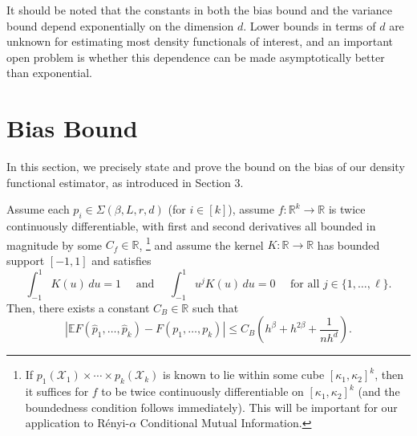 \documentclass{article} %
\newcommand{\R}{\mathbb{R}}                         %
\newcommand{\X}{\mathcal{X}}                        %
\newcommand{\E}{\mathbb{E}}                         %
\begin{document}
It should be noted that the constants in both the bias bound and the variance
bound depend exponentially on the dimension $d$. Lower bounds in terms of $d$
are unknown for estimating most density functionals of interest, and an
important open problem is whether this dependence can be made asymptotically
better than exponential.

\section{Bias Bound}
In this section, we precisely state and prove the bound on the bias of our
density functional estimator, as introduced in Section 3.

Assume each $p_i \in \Sigma(\beta,L,r,d)$ (for $i \in [k]$), assume
$f : \R^k \to \R$ is twice continuously differentiable, with first and second
derivatives all bounded in magnitude by some $C_f \in \R$,
\footnote{If $p_1(\X_1)\times\cdots\times p_k(\X_k)$ is known to lie within
some cube $[\kappa_1,\kappa_2]^k$, then it suffices for $f$ to be twice
continuously differentiable on $[\kappa_1,\kappa_2]^k$ (and the boundedness
condition follows immediately). This will be important for our application to
R\'enyi-$\alpha$ Conditional Mutual Information.}
and assume the kernel $K : \R \to \R$ has bounded support $[-1,1]$ and
satisfies
\[\int_{-1}^1 K(u) \, du = 1
    \quad\mbox{ and }\quad
    \int_{-1}^1 u^j K(u) \, du = 0
    \quad\mbox{ for all } j \in \{1,\dots,\ell\}.
\]
Then, there exists a constant $C_B \in \R$ such that
\[|\E F(\hat p_1,\dots,\hat p_k) - F(p_1,\dots,p_k)|
    \leq C_B \left( h^\beta + h^{2\beta} + \frac{1}{nh^d} \right).
\]
\end{document}
